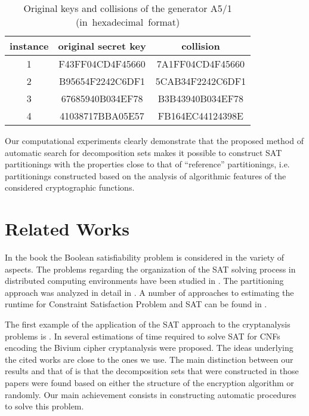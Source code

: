 \documentclass[runningheads,a4paper]{llncs}
\begin{document}
\begin{table}
\renewcommand{\arraystretch}{1.3}
\caption{Original keys and collisions of the generator A5/1 \mbox{(in hexadecimal format)} }
\label{Collisions}
\centering
\begin{tabular}{c|c|c}
\textbf{instance} & \textbf{original secret key} & \textbf{collision} \\ 
\hline
1 & F43FF04CD4F45660 & 7A1FF04CD4F45660 \\
\hline 
2 & B95654F2242C6DF1 & 5CAB34F2242C6DF1 \\
\hline 
3 & 67685940B034EF78 & B3B43940B034EF78 \\
\hline 
4 & 41038717BBA05E57 & FB164EC44124398E \\
\end{tabular}
\end{table}

Our computational experiments clearly demonstrate that the proposed method of automatic search for decomposition sets makes it possible to
construct SAT partitionings with the properties close to that of ``reference'' partitionings, i.e. partitionings constructed based on the analysis of algorithmic features of the considered cryptographic functions.

\section{Related Works}
In the book \cite{DBLP:series/faia/2009-185} the Boolean satisfiability problem is considered in the variety of aspects. The problems regarding the organization of the SAT solving process in distributed computing environments have been studied in \cite{DBLP:journals/jsc/ZhangBH96,DBLP:journals/pc/BlochingerSK03,DBLP:conf/sat/HyvarinenJN06,DBLP:journals/pc/ChrabakhW06,DBLP:conf/hvc/HeuleKWB11,Hyvarinen11}. The partitioning approach was analyzed in detail in \cite{DBLP:conf/sat/HyvarinenJN06,DBLP:conf/lpar/HyvarinenJN10,Hyvarinen11}. A number of approaches to estimating the runtime for Constraint Satisfaction Problem and SAT can be found in \cite{DBLP:journals/tcad/AloulSS03,DBLP:conf/aaai/KilbySTW06,DBLP:conf/sat/HaimW08,DBLP:journals/jair/XuHHL08}.

The first example of the application of the SAT approach to the cryptanalysis problems is \cite{DBLP:journals/jar/MassacciM00}. In \cite{techrep/Mcdonald07,DBLP:conf/sat/EibachPV08,DBLP:conf/sat/SoosNC09,DBLP:conf/tools/Soos10} several estimations of time required to solve SAT for CNFs encoding the Bivium cipher cryptanalysis were proposed. The ideas underlying the cited works are close to the ones we use. The main distinction between our results and that of \cite{techrep/Mcdonald07,DBLP:conf/sat/EibachPV08,DBLP:conf/sat/SoosNC09,DBLP:conf/tools/Soos10} is that the decomposition sets that were constructed in those papers were found based on either the structure of the encryption algorithm or randomly. Our main achievement consists in constructing automatic procedures to solve this problem.
\end{document}
